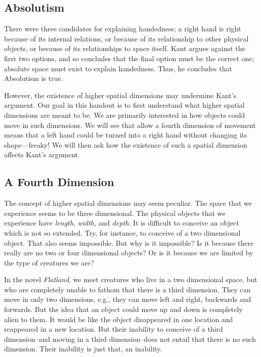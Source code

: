 \documentclass[oneside]{article}
\begin{document}
\subsection*{Absolutism}\label{absolutism}

There were three candidates for explaining handedness; a right hand is right because of its internal relations, or because of its relationship to other physical objects, or because of its relationships to space itself. Kant argues against the first two options, and so concludes that the final option must be the correct one; absolute space must exist to explain handedness. Thus, he concludes that Absolutism is true. 

However, the existence of higher spatial dimensions may undermine Kant's argument. Our goal in this handout is to first understand what higher spatial dimensions are meant to be. We are primarily interested in how objects could move in such dimensions. We will see that allow a fourth dimension of movement means that a left hand could be turned into a right hand without changing its shape---freaky! We will then ask how the existence of such a spatial dimension affects Kant's argument.

\subsection*{A Fourth Dimension}

The concept of higher spatial dimensions may seem peculiar. The space that we experience seems to be three dimensional. The physical objects that we experience have \emph{length}, \emph{width}, and \emph{depth}. It is difficult to conceive an object which is not so extended. Try, for instance, to conceive of a two dimensional object. That also seems impossible. But why is it impossible? Is it because there really are no two or four dimensional objects? Or is it because we are limited by the type of creatures we are? 

In the novel \emph{Flatland}, we meet creatures who live in a two dimensional space, but who are completely unable to fathom that there is a third dimension. They can move in only two dimensions, e.g., they can move left and right, backwards and forwards. But the idea that an object could move up and down is completely alien to them. It would be like the object disappeared in one location and reappeared in a new location. But their inability to conceive of a third dimension--and moving in a third dimension--does not entail that there is no such dimension. Their inability is just that, an inability. 
\end{document}
